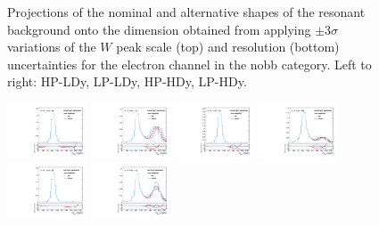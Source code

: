 \begin{figure}[htbp]
  \caption{
    Projections of the nominal and alternative shapes of the resonant background onto the \MJ dimension obtained from applying $\pm3\sigma$ variations of the $W$ peak scale (top) and resolution (bottom) uncertainties for the electron channel in the nobb category.
    Left to right: HP-LDy, LP-LDy, HP-HDy, LP-HDy.
  }
  \label{fig:systResMJ_scaleWY_resWY}
\end{figure}

\begin{figure}[htbp]
  \centering
  \includegraphics[width=0.21\textwidth]{fig/uncertainties/systs_res_e_HP_nobb_LDy_scaleTopY_ProjY.pdf}
  \includegraphics[width=0.21\textwidth]{fig/uncertainties/systs_res_e_LP_nobb_LDy_scaleTopY_ProjY.pdf}
  \includegraphics[width=0.21\textwidth]{fig/uncertainties/systs_res_e_HP_nobb_HDy_scaleTopY_ProjY.pdf}
  \includegraphics[width=0.21\textwidth]{fig/uncertainties/systs_res_e_LP_nobb_HDy_scaleTopY_ProjY.pdf}\\
  \includegraphics[width=0.21\textwidth]{fig/uncertainties/systs_res_e_HP_nobb_LDy_resTopY_ProjY.pdf}
  \includegraphics[width=0.21\textwidth]{fig/uncertainties/systs_res_e_LP_nobb_LDy_resTopY_ProjY.pdf}

\end{figure}
